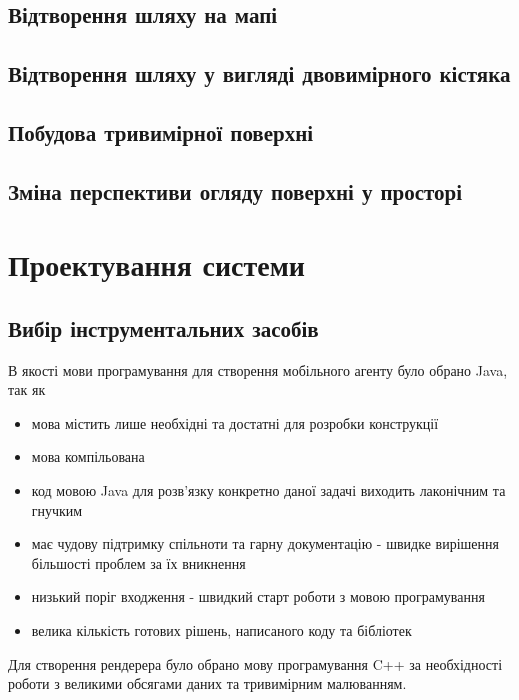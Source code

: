 \documentclass[simple,a4paper,14pt,ukrainian,utf8]{eskdtext}
\begin{document}
    \subsection{Відтворення шляху на мапі}
    
    \subsection{Відтворення шляху у вигляді двовимірного кістяка}
    
    \subsection{Побудова тривимірної поверхні}
    
    \subsection{Зміна перспективи огляду поверхні у просторі}
    
\newpage \section{Проектування системи}

    \subsection{Вибір інструментальних засобів}

        В якості мови програмування для створення мобільного агенту було обрано Java, так як

        \begin{itemize}
            \item мова містить лише необхідні та достатні для розробки конструкції
            \item мова компільована
            \item код мовою Java для розв’язку конкретно даної задачі виходить лаконічним та гнучким
            \item має чудову підтримку спільноти та гарну документацію - швидке вирішення більшості проблем за їх вникнення
            \item низький поріг входження - швидкий старт роботи з мовою програмування
            \item велика кількість готових рішень, написаного коду та бібліотек
        \end{itemize}
        
        Для створення рендерера було обрано мову програмування C++ за необхідності роботи з великими обсягами даних та тривимірним малюванням. 
        
\end{document}
